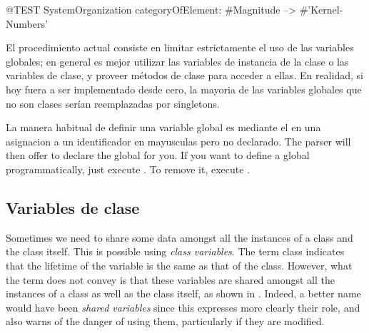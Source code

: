 \documentclass[a4paper,10pt,twoside]{book}
\begin{document}
\begin{code}{@TEST}
SystemOrganization categoryOfElement: #Magnitude --> #'Kernel-Numbers'
\end{code}

El procedimiento actual consiste en limitar estrictamente el uso de las variables globales; en general es mejor utilizar las variables de instancia de la clase o las variables de clase, y proveer m\'etodos de clase para acceder a ellas. En realidad, si \pharo hoy fuera a ser implementado desde cero, la mayoria de las variables globales que no son clases ser\'ian reemplazadas por singletons.

La manera habitual de definir una variable global es mediante el  en una asignacion a un identificador en mayusculas pero no declarado. The parser will then offer to declare the global for you.  If you want to define a global programmatically, just execute .  To remove it, execute .

\subsection{Variables de clase}

Sometimes we need to share some data amongst all the instances of a 
class and the class itself.
This is possible using \emph{class variables}. 
The term class  indicates that the lifetime of the variable is the same as that of the class. However, what the
term does not convey is that these variables are shared amongst all the instances of a class as well as the class itself,
as shown in .
Indeed, a better name would have been \emph{shared variables} since this expresses more clearly their role, and also warns of the danger of using them, particularly if they are modified.
\end{document}
